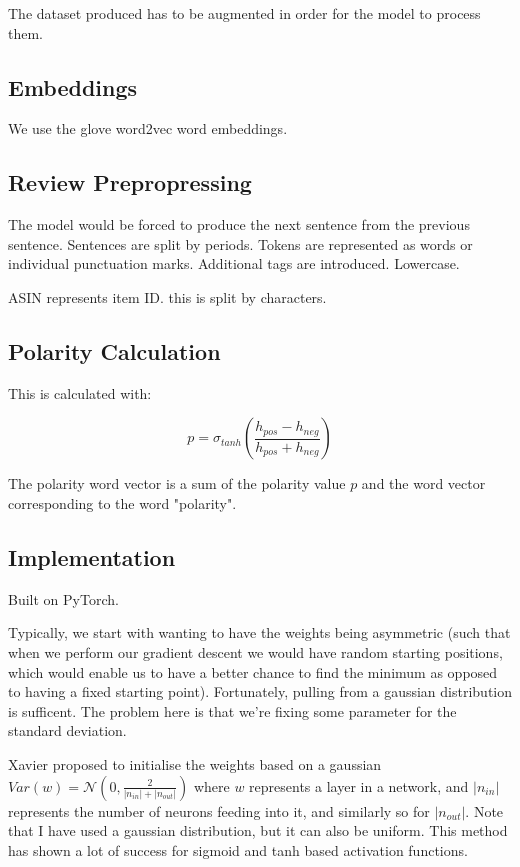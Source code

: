 \documentclass[12pt,twoside]{report}
\begin{document}
The dataset produced has to be augmented in order for the model to process them. 

\subsection{Embeddings}

We use the glove word2vec word embeddings.

\subsection{Review Prepropressing}

The model would be forced to produce the next sentence from the previous sentence. Sentences are split by periods. Tokens are represented as words or individual punctuation marks. Additional tags are introduced. Lowercase. 

ASIN represents item ID. this is split by characters.

\subsection{Polarity Calculation}

This is calculated with:

\begin{equation}
p = \sigma_{tanh}(\frac{h_{pos} - h_{neg}}{h_{pos} + h_{neg}})
\end{equation}

The polarity word vector is a sum of the polarity value $p$ and the word vector corresponding to the word "polarity".

\subsection{Implementation}

Built on PyTorch.

Typically, we start with wanting to have the weights being asymmetric (such that when we perform our gradient descent we would have random starting positions, which would enable us to have a better chance to find the minimum as opposed to having a fixed starting point). Fortunately, pulling from a gaussian distribution is sufficent. The problem here is that we're fixing some parameter for the standard deviation. 


Xavier 
proposed to initialise the weights based on a gaussian $Var(w)=\mathcal{N}(0,\frac{2}{|n_{in}| + |n_{out}| })$ where $w$ represents a layer in a network, and $|n_{in}|$ represents the number of neurons feeding into it, and similarly so for $|n_{out}|$. Note that I have used a gaussian distribution, but it can also be uniform. This method has shown a lot of success for sigmoid and tanh based activation functions.
\end{document}
